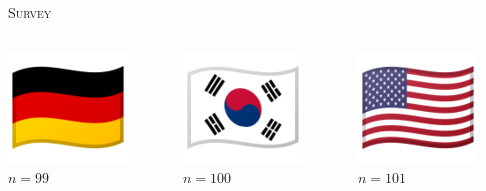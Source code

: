 \documentclass{beamer}
\begin{document}
\begin{frame}
    \centering
    \Large{\textsc{Survey}} \\ \vspace{1cm}
    \begin{columns}
        \begin{column}{.33\textwidth}
            \centering
            \includegraphics[width=.30\textwidth]{static/germany.png} \\
            $n=99$
        \end{column}
        \begin{column}{.33\textwidth}
            \centering
            \includegraphics[width=.30\textwidth]{static/south-korea.png} \\
            $n=100$
        \end{column}
        \begin{column}{.33\textwidth}
            \centering
            \includegraphics[width=.30\textwidth]{static/united-states.png} \\
            $n=101$
        \end{column}
    \end{columns}
\end{frame}
\end{document}
